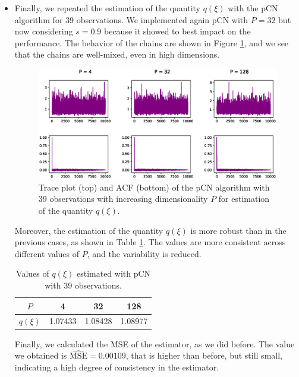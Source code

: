 \documentclass{article}
\begin{document}
\begin{itemize}
\item{
    Finally, we repeated the estimation of the quantity \(q(\xi)\) with the pCN algorithm for 39 observations. We implemented again 
    pCN with $P=32$ but now considering $s=0.9$ because it showed to best impact on the performance. The behavior of the chains are shown in Figure \ref{fig:Integral2}, and
    we see that the chains are well-mixed, even in high dimensions. 

    \begin{figure}[H]
        \centering
        \includegraphics[width=\textwidth]{plots/Integral2.eps}
        \caption{Trace plot (top) and ACF (bottom) of the pCN algorithm with 39 observations with increasing dimensionality \(P\) 
        for estimation of the quantity $q(\xi)$.}
        \label{fig:Integral2}
    \end{figure}
    
    Moreover, the estimation of the quantity \(q(\xi)\) is more robust than in the previous cases, as shown in Table \ref{tab:q_estimation2}.
    The values are more consistent across different values of \(P\), and the variability is reduced. 

    \begin{table}[H]
        \centering
        \begin{tabular}{|c|c|c|c|}
        \hline
        $P$ & 4 & 32 & 128 \\ \hline
        $q(\xi)$ & 1.07433 & 1.08428  & 1.08977   \\ \hline
        \end{tabular}
        \caption{Values of $q(\xi)$ estimated with pCN with 39 observations.}
        \label{tab:q_estimation2}
    \end{table}

    Finally, we calculated the MSE of the estimator, as we did before. The value we obtained is $\hat{\text{MSE}}= 0.00109$, that 
    is higher than before, but still small, indicating a high degree of consistency in the estimator.
}

\end{itemize}
\end{document}
